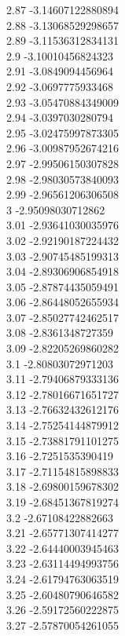 {2.87	-3.14607122880894\\
2.88	-3.13068529298657\\
2.89	-3.11536312834131\\
2.9	-3.10010456824323\\
2.91	-3.0849094456964\\
2.92	-3.0697775933468\\
2.93	-3.05470884349009\\
2.94	-3.0397030280794\\
2.95	-3.02475997873305\\
2.96	-3.00987952674216\\
2.97	-2.99506150307828\\
2.98	-2.98030573840093\\
2.99	-2.96561206306508\\
3	-2.95098030712862\\
3.01	-2.93641030035976\\
3.02	-2.92190187224432\\
3.03	-2.90745485199313\\
3.04	-2.89306906854918\\
3.05	-2.87874435059491\\
3.06	-2.86448052655934\\
3.07	-2.85027742462517\\
3.08	-2.8361348727359\\
3.09	-2.82205269860282\\
3.1	-2.80803072971203\\
3.11	-2.79406879333136\\
3.12	-2.78016671651727\\
3.13	-2.76632432612176\\
3.14	-2.75254144879912\\
3.15	-2.73881791101275\\
3.16	-2.7251535390419\\
3.17	-2.71154815898833\\
3.18	-2.69800159678302\\
3.19	-2.68451367819274\\
3.2	-2.67108422882663\\
3.21	-2.65771307414277\\
3.22	-2.64440003945463\\
3.23	-2.63114494993756\\
3.24	-2.61794763063519\\
3.25	-2.60480790646582\\
3.26	-2.59172560222875\\
3.27	-2.57870054261055\\
}
